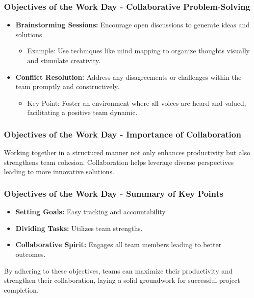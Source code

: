 \documentclass{beamer}
\begin{document}
\begin{frame}[fragile]
    \frametitle{Objectives of the Work Day - Collaborative Problem-Solving}
    \begin{itemize}
        \item \textbf{Brainstorming Sessions:} Encourage open discussions to generate ideas and solutions.
        \begin{itemize}
            \item Example: Use techniques like mind mapping to organize thoughts visually and stimulate creativity.
        \end{itemize}

        \item \textbf{Conflict Resolution:} Address any disagreements or challenges within the team promptly and constructively.
        \begin{itemize}
            \item Key Point: Foster an environment where all voices are heard and valued, facilitating a positive team dynamic.
        \end{itemize}
    \end{itemize}
\end{frame}

\begin{frame}[fragile]
    \frametitle{Objectives of the Work Day - Importance of Collaboration}
    Working together in a structured manner not only enhances productivity but also strengthens team cohesion. Collaboration helps leverage diverse perspectives leading to more innovative solutions.
\end{frame}

\begin{frame}[fragile]
    \frametitle{Objectives of the Work Day - Summary of Key Points}
    \begin{itemize}
        \item \textbf{Setting Goals:} Easy tracking and accountability.
        \item \textbf{Dividing Tasks:} Utilizes team strengths.
        \item \textbf{Collaborative Spirit:} Engages all team members leading to better outcomes.
    \end{itemize}
    
    By adhering to these objectives, teams can maximize their productivity and strengthen their collaboration, laying a solid groundwork for successful project completion.
\end{frame}
\end{document}
